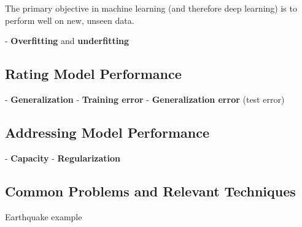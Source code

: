 The primary objective in machine learning (and therefore deep learning) is to perform well on new, unseen data. 

- \textbf{Overfitting} and \textbf{underfitting}

\subsection{Rating Model Performance}
- \textbf{Generalization}
- \textbf{Training error}  
- \textbf{Generalization error} (test error)

\subsection{Addressing Model Performance}
- \textbf{Capacity}
- \textbf{Regularization}

\subsection{Common Problems and Relevant Techniques}

Earthquake example